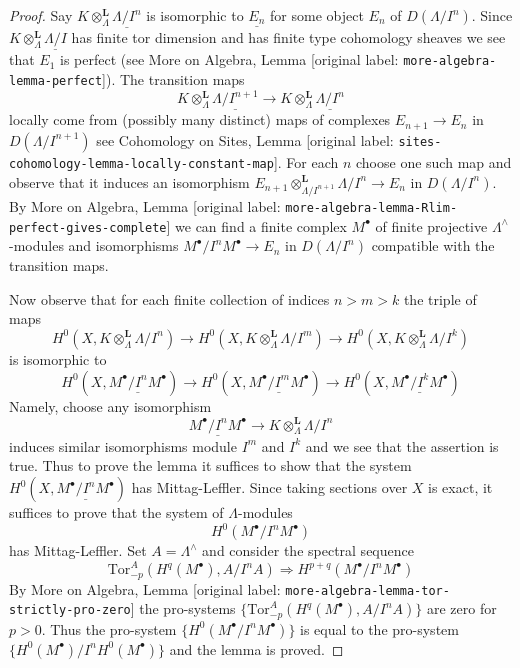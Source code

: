 \documentclass[10pt,a4paper]{article}
\theoremstyle{plain}
\theoremstyle{definition}
\theoremstyle{remark}
\numberwithin{equation}{subsection}
\begin{document}
\begin{proof}
Say $K \otimes_\Lambda^\mathbf{L} \underline{\Lambda/I^n}$ is isomorphic
to $\underline{E_n}$ for some object $E_n$ of $D(\Lambda/I^n)$.
Since $K \otimes_\Lambda^\mathbf{L} \underline{\Lambda/I}$ has
finite tor dimension and has finite type cohomology sheaves
we see that $E_1$ is perfect (see
More on Algebra, Lemma [original label: \nolinkurl{more-algebra-lemma-perfect}]). The transition maps
$$
K \otimes_\Lambda^\mathbf{L} \underline{\Lambda/I^{n + 1}}
\to
K \otimes_\Lambda^\mathbf{L} \underline{\Lambda/I^n}
$$
locally come from (possibly many distinct) maps of complexes
$E_{n + 1} \to E_n$ in $D(\Lambda/I^{n + 1})$ see
Cohomology on Sites, Lemma [original label: \nolinkurl{sites-cohomology-lemma-locally-constant-map}].
For each $n$ choose one such map and observe that it induces
an isomorphism
$E_{n + 1} \otimes_{\Lambda/I^{n + 1}}^\mathbf{L} \Lambda/I^n \to E_n$
in $D(\Lambda/I^n)$. By
More on Algebra, Lemma [original label: \nolinkurl{more-algebra-lemma-Rlim-perfect-gives-complete}]
we can find a finite complex $M^\bullet$ of finite projective
$\Lambda^\wedge$-modules and isomorphisms $M^\bullet/I^nM^\bullet \to E_n$
in $D(\Lambda/I^n)$ compatible with the transition maps.

\medskip\noindent
Now observe that for each finite collection of indices
$n > m > k$ the triple of maps
$$
H^0(X, K \otimes_\Lambda^\mathbf{L} \Lambda/I^n)
\to
H^0(X, K \otimes_\Lambda^\mathbf{L} \Lambda/I^m)
\to
H^0(X, K \otimes_\Lambda^\mathbf{L} \Lambda/I^k)
$$
is isomorphic to
$$
H^0(X, \underline{M^\bullet/I^nM^\bullet})
\to
H^0(X, \underline{M^\bullet/I^mM^\bullet})
\to
H^0(X, \underline{M^\bullet/I^kM^\bullet})
$$
Namely, choose any isomorphism
$$
\underline{M^\bullet/I^nM^\bullet} \to
K \otimes_\Lambda^\mathbf{L} \Lambda/I^n
$$
induces similar isomorphisms module $I^m$ and $I^k$ and we see that
the assertion is true. Thus to prove the lemma it suffices to show that
the system
$H^0(X, \underline{M^\bullet/I^nM^\bullet})$ has Mittag-Leffler.
Since taking sections over $X$ is exact, it suffices to prove that
the system of $\Lambda$-modules
$$
H^0(M^\bullet/I^nM^\bullet)
$$
has Mittag-Leffler. Set $A = \Lambda^\wedge$ and consider the spectral
sequence
$$
\text{Tor}_{-p}^A(H^q(M^\bullet), A/I^nA) \Rightarrow
H^{p + q}(M^\bullet/I^nM^\bullet)
$$
By More on Algebra, Lemma [original label: \nolinkurl{more-algebra-lemma-tor-strictly-pro-zero}]
the pro-systems $\{\text{Tor}_{-p}^A(H^q(M^\bullet), A/I^nA)\}$ are zero
for $p > 0$. Thus the pro-system $\{H^0(M^\bullet/I^nM^\bullet)\}$
is equal to the pro-system $\{H^0(M^\bullet)/I^nH^0(M^\bullet)\}$
and the lemma is proved.
\end{proof}
\end{document}
